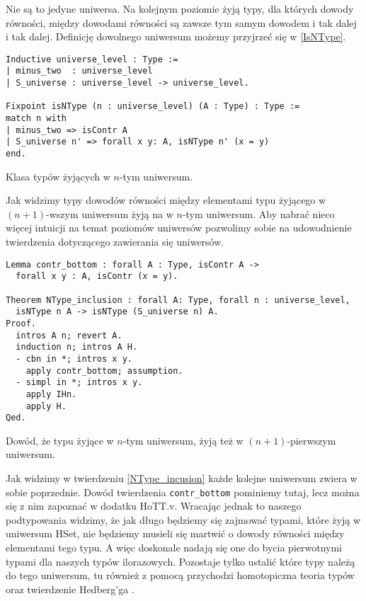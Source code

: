Nie są to jedyne uniwersa. Na kolejnym poziomie żyją typy, dla których dowody równości, między dowodami równości są zawsze tym samym dowodem i tak dalej i tak dalej. Definicję dowolnego uniwersum możemy przyjrzeć się w \ref{IsNType}.
\begin{code}
\begin{verbatim}
Inductive universe_level : Type :=
| minus_two  : universe_level
| S_universe : universe_level -> universe_level.

Fixpoint isNType (n : universe_level) (A : Type) : Type :=
match n with
| minus_two => isContr A
| S_universe n' => forall x y: A, isNType n' (x = y)
end.
\end{verbatim}
\caption{Klasa typów żyjących w $n$-tym uniwersum.}
\label{IsNType}
\end{code}
Jak widzimy typy dowodów równości między elementami typu żyjącego w $(n+1)$-wszym uniwersum żyją na w $n$-tym uniwersum. Aby nabrać nieco więcej intuicji na temat poziomów uniwersów pozwolimy sobie na udowodnienie twierdzenia dotyczącego zawierania się uniwersów. 
\begin{code}
\begin{verbatim}
Lemma contr_bottom : forall A : Type, isContr A -> 
  forall x y : A, isContr (x = y).

Theorem NType_inclusion : forall A: Type, forall n : universe_level,
  isNType n A -> isNType (S_universe n) A.
Proof.
  intros A n; revert A.
  induction n; intros A H.
  - cbn in *; intros x y.
    apply contr_bottom; assumption.
  - simpl in *; intros x y.
    apply IHn.
    apply H.
Qed.
\end{verbatim}
\caption{Dowód, że typu żyjące w $n$-tym uniwersum, żyją też w $(n+1)$-pierwszym uniwersum.}
\label{NType_incusion}
\end{code}
Jak widzimy w twierdzeniu \ref{NType_incusion} każde kolejne uniwersum zwiera w sobie poprzednie. Dowód twierdzenia \texttt{contr_bottom} pominiemy tutaj, lecz można się z nim zapoznać w dodatku HoTT.v. Wracając jednak to naszego podtypowania widzimy, że jak długo będziemy się zajmować typami, które żyją w uniwersum HSet, nie będziemy musieli się martwić o dowody równości między elementami tego typu. A więc doskonale nadają się one do bycia pierwotnymi typami dla naszych typów ilorazowych. Pozostaje tylko ustalić które typy należą do tego uniwersum, tu również z pomocą przychodzi homotopiczna teoria typów oraz twierdzenie Hedberg'ga \cite{hedberg_1998}.
